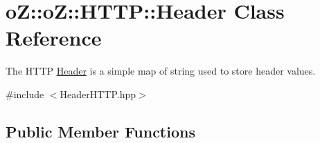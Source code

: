 \hypertarget{classo_z_1_1o_z_1_1_h_t_t_p_1_1_header}{}\section{oZ\+::oZ\+::H\+T\+TP\+::Header Class Reference}
\label{classo_z_1_1o_z_1_1_h_t_t_p_1_1_header}


The H\+T\+TP \mbox{\hyperlink{classo_z_1_1o_z_1_1_h_t_t_p_1_1_header}{Header}} is a simple map of string used to store header values.  




{\ttfamily \#include $<$Header\+H\+T\+T\+P.\+hpp$>$}

\subsection*{Public Member Functions}
